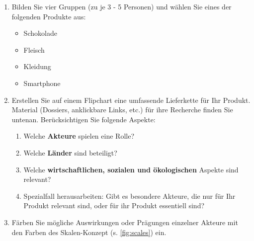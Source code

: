 \begin{myexercise}
    \begin{enumerate}
        \item Bilden Sie vier Gruppen (zu je 3 - 5 Personen) und wählen Sie eines der folgenden Produkte aus:
              \begin{itemize}
                  \item Schokolade
                  \item Fleisch
                  \item Kleidung
                  \item Smartphone
              \end{itemize}

        \item Erstellen Sie auf einem Flipchart eine umfassende Lieferkette für Ihr Produkt. Material (Dossiers, anklickbare Links, etc.) für ihre Recherche finden Sie untenan.
              Berücksichtigen Sie folgende Aspekte:
              \begin{enumerate}
                  \item Welche \textbf{Akteure} spielen eine Rolle?
                  \item Welche \textbf{Länder} sind beteiligt?
                  \item Welche \textbf{wirtschaftlichen, sozialen und ökologischen} Aspekte sind relevant?
                  \item Spezialfall herausarbeiten: Gibt es besondere Akteure, die nur für Ihr Produkt relevant sind, oder für ihr Produkt essentiell sind?
              \end{enumerate}
        \item Färben Sie mögliche Auswirkungen oder Prägungen einzelner Akteure mit den Farben des Skalen-Konzept (s. \cref{fig:scales}) ein.
    \end{enumerate}


\end{myexercise}
